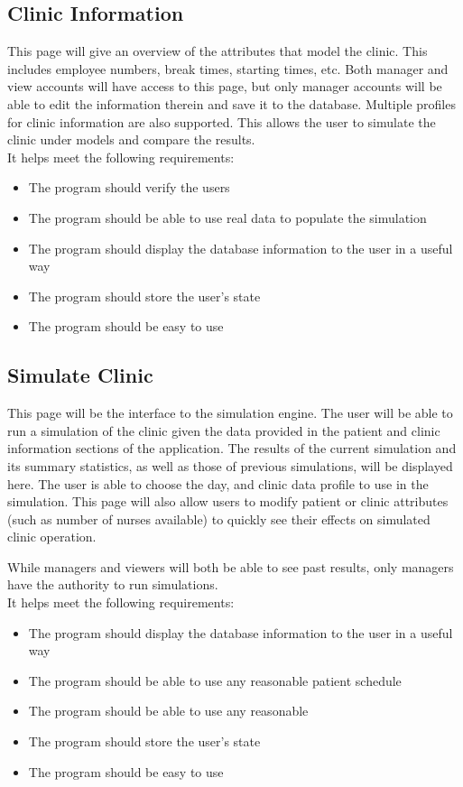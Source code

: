\documentclass[12pt]{article}
\begin{document}
\subsection{Clinic Information}
This page will give an overview of the attributes that model the clinic. This includes employee numbers, break times, starting times, etc. Both manager and view accounts will have access to this page, but only manager accounts will be able to edit the information therein and save it to the database. Multiple profiles for clinic information are also supported. This allows the user to simulate the clinic under models and compare the results.
\\
It helps meet the following requirements:
\begin{itemize}
	\item The program should verify the users
	\item The program should be able to use real data to populate the simulation
	\item The program should display the database information to the user in a useful way
	\item The program should store the user's state
	\item The program should be easy to use
\end{itemize}

\subsection{Simulate Clinic}
This page will be the interface to the simulation engine. The user will be able to run a simulation of the clinic given the data provided in the patient and clinic information sections of the application. The results of the current simulation and its summary statistics, as well as those of previous simulations, will be displayed here. The user is able to choose the day, and clinic data profile to use in the simulation. This page will also allow users to modify patient or clinic attributes (such as number of nurses available) to quickly see their effects on simulated clinic operation. 

\noindent \newline
While managers and viewers will both be able to see past results, only managers have the authority to run simulations.
\\
It helps meet the following requirements:
\begin{itemize}
	\item The program should display the database information to the user in a useful way
	\item The program should be able to use any reasonable patient schedule
	\item The program should be able to use any reasonable
	\item The program should store the user's state
	\item The program should be easy to use
\end{itemize}
\end{document}
